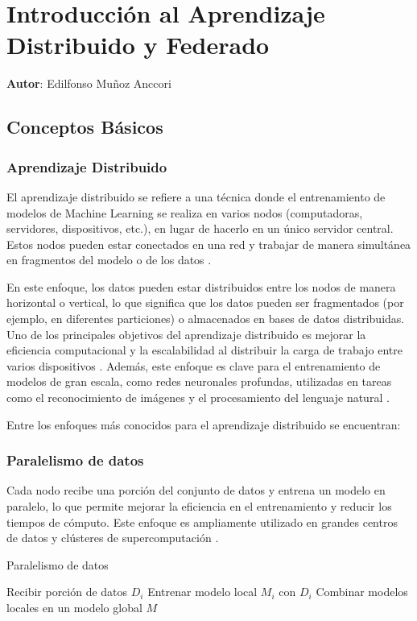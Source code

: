 
\chapter{Introducción al Aprendizaje Distribuido y Federado}
\textbf{Autor}: \large{Edilfonso Muñoz Anccori}
\label{chap:13}

\vspace{1em}

\section{Conceptos Básicos}
\subsection{Aprendizaje Distribuido}
El aprendizaje distribuido se refiere a una técnica donde el entrenamiento de modelos de Machine Learning se realiza en varios nodos (computadoras, servidores, dispositivos, etc.), en lugar de hacerlo en un único servidor central. Estos nodos pueden estar conectados en una red y trabajar de manera simultánea en fragmentos del modelo o de los datos \cite{dean2012large}.

En este enfoque, los datos pueden estar distribuidos entre los nodos de manera horizontal o vertical, lo que significa que los datos pueden ser fragmentados (por ejemplo, en diferentes particiones) o almacenados en bases de datos distribuidas. Uno de los principales objetivos del aprendizaje distribuido es mejorar la eficiencia computacional y la escalabilidad al distribuir la carga de trabajo entre varios dispositivos \cite{zaeraaprendizaje}. Además, este enfoque es clave para el entrenamiento de modelos de gran escala, como redes neuronales profundas, utilizadas en tareas como el reconocimiento de imágenes y el procesamiento del lenguaje natural \cite{lecun2015deep}.

Entre los enfoques más conocidos para el aprendizaje distribuido se encuentran:

\subsection{Paralelismo de datos}
Cada nodo recibe una porción del conjunto de datos y entrena un modelo en paralelo, lo que permite mejorar la eficiencia en el entrenamiento y reducir los tiempos de cómputo. Este enfoque es ampliamente utilizado en grandes centros de datos y clústeres de supercomputación \cite{li2020federated}.
\begin{algorithm}
	\caption{Paralelismo de datos}
	\begin{algorithmic}[1]
		\State Recibir porción de datos $D_i$
		\State Entrenar modelo local $M_i$ con $D_i$
		\EndFor
		\State Combinar modelos locales en un modelo global $M$
	\end{algorithmic}
\end{algorithm}
